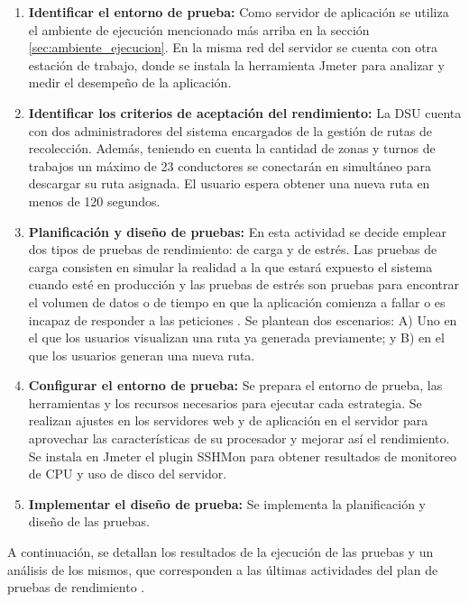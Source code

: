 \begin{enumerate}
    \item \textbf{Identificar el entorno de prueba:}
        Como servidor de aplicación se utiliza el ambiente de ejecución mencionado más arriba en la sección \ref{sec:ambiente_ejecucion}. En la misma red del servidor se cuenta con otra estación de trabajo, donde se instala la herramienta Jmeter \citep{ApacheJMeter} para analizar y medir el desempeño de la aplicación.
    \item \textbf{Identificar los criterios de aceptación del rendimiento:}
        La DSU cuenta con dos administradores del sistema encargados de la gestión de rutas de recolección. Además, teniendo en cuenta la cantidad de zonas y turnos de trabajos un máximo de 23 conductores se conectarán en simultáneo para descargar su ruta asignada. El usuario espera obtener una nueva ruta en menos de 120 segundos.
    \item \textbf{Planificación y diseño de pruebas:}
        En esta actividad se decide emplear dos tipos de pruebas de rendimiento: de carga y de estrés. Las pruebas de carga consisten en simular la realidad a la que estará expuesto el sistema cuando esté en producción y las pruebas de estrés son pruebas para encontrar el volumen de datos o de tiempo en que la aplicación comienza a fallar o es incapaz de responder a las peticiones \citep{ToledoRodriguez2014IntroduccionInformacion}. Se plantean dos escenarios: A) Uno en el que los usuarios visualizan una ruta ya generada previamente; y B) en el que los usuarios generan una nueva ruta.
    \item \textbf{Configurar el entorno de prueba:}
        Se prepara el entorno de prueba, las herramientas y los recursos necesarios para ejecutar cada estrategia. Se realizan ajustes en los servidores web y de aplicación en el servidor para aprovechar las características de su procesador y mejorar así el rendimiento. Se instala en Jmeter el plugin SSHMon \citep{Jmeter-sshmon} para obtener resultados de monitoreo de CPU y uso de disco del servidor.
    \item \textbf{Implementar el diseño de prueba:}
        Se implementa la planificación y diseño de las pruebas.
\end{enumerate}

A continuación, se detallan los resultados de la ejecución de las pruebas y un análisis de los mismos, que corresponden a las últimas actividades del plan de pruebas de rendimiento \citep{Corporation2007PerformanceApplications}.

